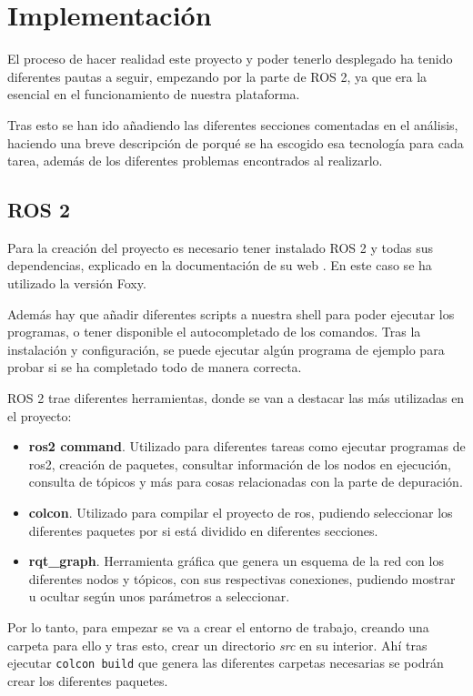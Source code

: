\chapter{Implementación}

El proceso de hacer realidad este proyecto y poder tenerlo desplegado ha tenido diferentes pautas a seguir, empezando por la parte de ROS 2, ya que era la esencial en el funcionamiento de nuestra plataforma.

Tras esto se han ido añadiendo las diferentes secciones comentadas en el análisis, haciendo una breve descripción de porqué se ha escogido esa tecnología para cada tarea, además de los diferentes problemas encontrados al realizarlo.

\section{ROS 2}

Para la creación del proyecto es necesario tener instalado ROS 2 y todas sus dependencias, explicado en la documentación de su web \cite{ros2}. En este caso se ha utilizado la versión Foxy.

Además hay que añadir diferentes scripts a nuestra shell para poder ejecutar los programas, o tener disponible el autocompletado de los comandos. Tras la instalación y configuración, se puede ejecutar algún programa de ejemplo para probar si se ha completado todo de manera correcta. 

ROS 2 trae diferentes herramientas, donde se van a destacar las más utilizadas en el proyecto:

\begin{itemize}
    \item \textbf{ros2 command}. Utilizado para diferentes tareas como ejecutar programas de ros2, creación de paquetes, consultar información de los nodos en ejecución, consulta de tópicos y más para cosas relacionadas con la parte de depuración.
    \item \textbf{colcon}. Utilizado para compilar el proyecto de ros, pudiendo seleccionar los diferentes paquetes por si está dividido en diferentes secciones.
    \item \textbf{rqt\_graph}. Herramienta gráfica que genera un esquema de la red con los diferentes nodos y tópicos, con sus respectivas conexiones, pudiendo mostrar u ocultar según unos parámetros a seleccionar.
\end{itemize}

Por lo tanto, para empezar se va a crear el entorno de trabajo, creando una carpeta para ello y tras esto, crear un directorio \textit{src} en su interior. Ahí tras ejecutar \verb|colcon build| que genera las diferentes carpetas necesarias se podrán crear los diferentes paquetes.

